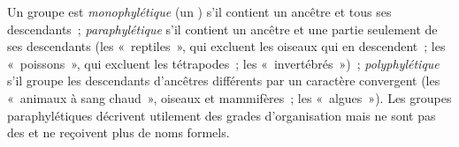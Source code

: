 \begin{definition}\label{def:b1:classifying-biodiversity:monophyly}
Un groupe est \emph{monophylétique} (un ) s'il contient un ancêtre
et tous ses descendants~; \emph{paraphylétique} s'il contient un ancêtre
et une partie seulement de ses descendants (les «~reptiles~», qui
excluent les oiseaux qui en descendent~; les «~poissons~», qui excluent
les tétrapodes~; les «~invertébrés~»)~; \emph{polyphylétique} s'il groupe
les descendants d'ancêtres différents par un caractère convergent (les
«~animaux à sang chaud~», oiseaux et mammifères~; les «~algues~»). Les
groupes paraphylétiques décrivent utilement des grades d'organisation
mais ne sont pas des  et ne reçoivent plus de noms formels.
\end{definition}

